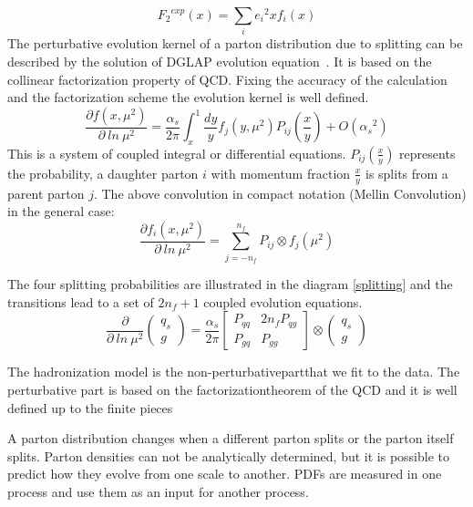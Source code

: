 \begin{equation}
{{F}_2}^{exp} (x)= \sum_i {e_i}^2 x f_i(x)
\end{equation}
The perturbative evolution kernel of a parton
distribution due to splitting can be described by the solution of DGLAP evolution equation~\cite{Ward:1995xy}.  It is based on the collinear factorization property of QCD. Fixing the accuracy of the calculation and the factorization scheme the evolution kernel is well defined.  
\begin{equation}
\frac{\partial f(x, \mu^2) }{\partial \: ln \:\mu^2}=
\frac{\alpha_s}{2\pi}\int_{x}^{1}\frac{dy}{y} f_j(y, \mu^2) P_{ij}(\frac{x}{y})+O({\alpha_s}^2)
\end{equation}
This is a system of coupled integral or differential equations. $ P_{ij}(\frac{x}{y}) $ represents the probability, a daughter parton $ i $ with momentum fraction $ \frac{x}{y} $ is splits from a parent parton $ j $.
The above convolution in compact notation (Mellin Convolution) in the general case:
\begin{equation}
\frac{\partial f_i(x, \mu^2) }{\partial \: ln \:\mu^2}=
\sum_{j=-n_f}^{n_f} P_{ij} \otimes f_j(\mu^2)
\end{equation}

The four splitting probabilities are illustrated in the diagram \ref{splitting} and the transitions lead to a set of $ 2n_f +1 $ coupled evolution equations.
\begin{equation}
\frac{\partial }{\partial \: ln \:\mu^2} \left(\begin{array}{c}q_s\\ g\end{array}\right)=
\frac{\alpha_s}{2\pi}\begin{bmatrix}P_{qq} & 2n_fP_{qg} \\P_{gq} & P_{gg} \end{bmatrix}\otimes\left(\begin{array}{c}q_s\\ g\end{array}\right)
\end{equation}

The hadronization model is the non-perturbativepartthat we fit to the data. The perturbative part is based on the factorizationtheorem of the QCD and it is well defined up to the finite pieces

A parton distribution changes when a different parton splits or the parton itself splits. Parton densities can not be analytically determined, but it is possible to predict how they evolve from one scale to another. PDFs are measured in one process and use them as an input for another process.



